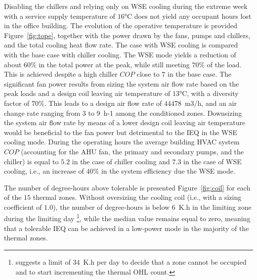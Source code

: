 Disabling the chillers and relying only on WSE cooling during the extreme week with a service supply temperature of $16$°C does not yield any occupant hours lost in the office building.
The evolution of the operative temperature is provided Figure~\ref{fig:tope}, together with the power drawn by the fans, pumps and chillers, and the total cooling heat flow rate. The case with WSE cooling is compared with the base case with chiller cooling.
The WSE mode yields a reduction of about $60\%$ in the total power at the peak, while still meeting $70\%$ of the load.
This is achieved despite a high chiller $COP$ close to $7$ in the base case.
The significant fan power results from sizing the system air flow rate based on the peak loads and a design coil leaving air temperature of $13$°C, with a diversity factor of $70\%$. This leads to a design air flow rate of $44478$~m3/h, and an air change rate ranging from $3$ to $9$~h-1 among the conditioned zones. Downsizing the system air flow rate by means of a lower design coil leaving air temperature would be beneficial to the fan power but detrimental to the IEQ in the WSE cooling mode.
During the operating hours the average building HVAC system $COP$ (accounting for the AHU fan, the primary and secondary pumps, and the chiller) is equal to $5.2$ in the case of chiller cooling and $7.3$ in the case of WSE cooling, i.e., an increase of $40\%$ in the system efficiency due the WSE mode.

The number of degree-hours above tolerable is presented Figure~\ref{fig:coil} for each of the $15$ thermal zones. Without oversizing the cooling coil (i.e., with a sizing coefficient of $1.0$), the number of degree-hours is below $6$~K.h in the limiting zone during the limiting day%
\footnote{%
\cite{Mathew2021} suggests a limit of $34$~K.h per day to decide that a zone cannot be occupied and to start incrementing the thermal OHL count.}, while the median value remains equal to zero, meaning that a tolerable IEQ can be achieved in a low-power mode in the majority of the thermal zones.

